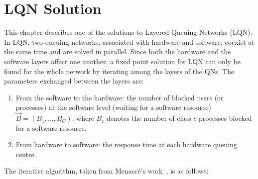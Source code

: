 

 \chapter{LQN Solution} 
 \label{ch:appendix1} 
This chapter describes one of the solutions to Layered Queuing Networks (LQN). 
In LQN, two queuing networks, associated with hardware and software, coexist at the same time and are solved in parallel. 
 Since both the hardware and the software layers affect one another, a fixed point solution for LQN can only be found for the whole network \cite{petriu_approximate_1991} by iterating among the layers of the QNs. The parameters exchanged between the layers are:  
 \begin{enumerate} 
 \item From the software to the hardware: the number of blocked users (or processes) at the software level (waiting for a software resource) $\vec{B}=(B_1, \ldots , B_C)$, 
 where $B_c$  denotes the number of class $c$ processes blocked for a software resource. 
 \item From hardware to software: the response time at each hardware queuing centre. 
 \end{enumerate}
 The iterative algorithm, taken from Menasc{\'e}'s work~\cite{menasce2004performance,menasce2002simple}, is as follows: 
